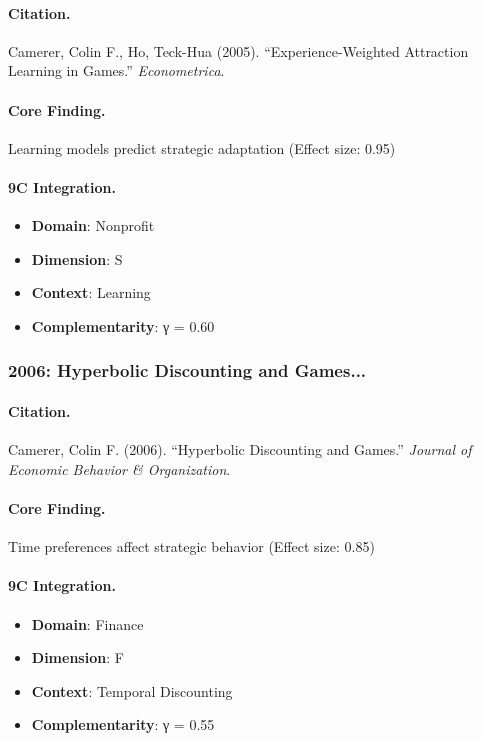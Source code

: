 \paragraph{Citation.}
Camerer, Colin F., Ho, Teck-Hua (2005). ``Experience-Weighted Attraction Learning in Games.''
\textit{Econometrica}.

\paragraph{Core Finding.}
Learning models predict strategic adaptation (Effect size: 0.95)

\paragraph{9C Integration.}
\begin{itemize}[nosep]
  \item \textbf{Domain}: Nonprofit
  \item \textbf{Dimension}: S
  \item \textbf{Context}: Learning
  \item \textbf{Complementarity}: γ = 0.60
\end{itemize}

\subsubsection{2006: Hyperbolic Discounting and Games...}

\paragraph{Citation.}
Camerer, Colin F. (2006). ``Hyperbolic Discounting and Games.''
\textit{Journal of Economic Behavior & Organization}.

\paragraph{Core Finding.}
Time preferences affect strategic behavior (Effect size: 0.85)

\paragraph{9C Integration.}
\begin{itemize}[nosep]
  \item \textbf{Domain}: Finance
  \item \textbf{Dimension}: F
  \item \textbf{Context}: Temporal Discounting
  \item \textbf{Complementarity}: γ = 0.55
\end{itemize}

